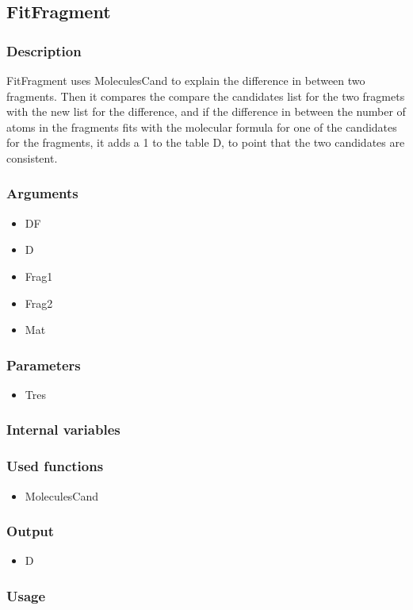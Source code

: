 \subsection{FitFragment}\label{FitFragment}
\subsubsection{Description}
FitFragment uses MoleculesCand to explain the difference in between two fragments. Then it compares the compare the candidates list for the two fragmets with the new list for the difference, and if the difference in between the number of atoms in the fragments fits with the molecular formula for one of the candidates for the fragments, it adds a 1 to the table D, to point that the two candidates are consistent.
\subsubsection{Arguments}
\begin{itemize}
\item DF
\item D
\item Frag1
\item Frag2
\item Mat
\end{itemize}
\subsubsection{Parameters}
\begin{itemize}
\item Tres
\end{itemize}
\subsubsection{Internal variables}
\subsubsection{Used functions}
\begin{itemize}
\item MoleculesCand
\end{itemize}
\subsubsection{Output}
\begin{itemize}
\item D
\end{itemize}
\subsubsection{Usage}



